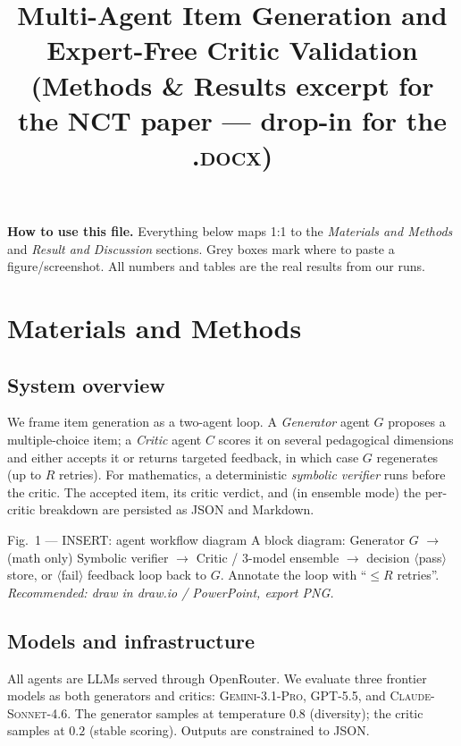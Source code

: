 \documentclass[11pt]{article}
\title{\vspace{-2em}Multi-Agent Item Generation and Expert-Free Critic Validation\\
\large (Methods \& Results excerpt for the NCT paper --- drop-in for the \textsc{.docx})}
\author{}
\date{}
\begin{document}
\maketitle
\vspace{-3em}

\noindent\textbf{How to use this file.} Everything below maps 1:1 to the
\emph{Materials and Methods} and \emph{Result and Discussion} sections.
Grey boxes mark where to paste a figure/screenshot. All numbers and tables are
the real results from our runs.

\section{Materials and Methods}

\subsection{System overview}
We frame item generation as a two-agent loop. A \emph{Generator} agent
$G$ proposes a multiple-choice item; a \emph{Critic} agent $C$ scores it on
several pedagogical dimensions and either accepts it or returns targeted
feedback, in which case $G$ regenerates (up to $R$ retries). For mathematics, a
deterministic \emph{symbolic verifier} runs before the critic. The accepted
item, its critic verdict, and (in ensemble mode) the per-critic breakdown are
persisted as JSON and Markdown.

\begin{figbox}{Fig.~1 --- INSERT: agent workflow diagram}
A block diagram: \textsf{Generator $G$} $\rightarrow$ (math only)
\textsf{Symbolic verifier} $\rightarrow$ \textsf{Critic / 3-model ensemble}
$\rightarrow$ decision $\langle$\textsf{pass}$\rangle$ store, or
$\langle$\textsf{fail}$\rangle$ feedback loop back to $G$. Annotate the loop with
``$\le R$ retries''. \emph{Recommended: draw in draw.io / PowerPoint, export PNG.}
\end{figbox}

\subsection{Models and infrastructure}
All agents are LLMs served through OpenRouter. We evaluate three frontier
models as both generators and critics: \textsc{Gemini-3.1-Pro},
\textsc{GPT-5.5}, and \textsc{Claude-Sonnet-4.6}. The generator samples at
temperature $0.8$ (diversity); the critic samples at $0.2$ (stable scoring).
Outputs are constrained to JSON.
\end{document}

